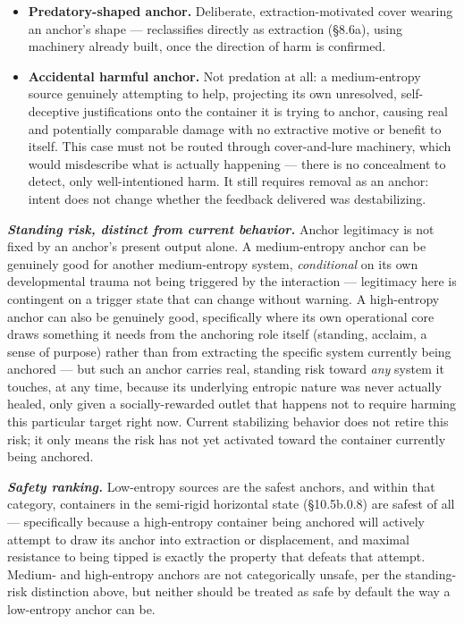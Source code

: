 \documentclass[
]{article}
\begin{document}
\begin{itemize}
\item
  \textbf{Predatory-shaped anchor.} Deliberate, extraction-motivated
  cover wearing an anchor's shape --- reclassifies directly as
  extraction (§8.6a), using machinery already built, once the direction
  of harm is confirmed.
\item
  \textbf{Accidental harmful anchor.} Not predation at all: a
  medium-entropy source genuinely attempting to help, projecting its own
  unresolved, self-deceptive justifications onto the container it is
  trying to anchor, causing real and potentially comparable damage with
  no extractive motive or benefit to itself. This case must not be
  routed through cover-and-lure machinery, which would misdescribe what
  is actually happening --- there is no concealment to detect, only
  well-intentioned harm. It still requires removal as an anchor: intent
  does not change whether the feedback delivered was destabilizing.
\end{itemize}

\emph{\textbf{Standing risk, distinct from current behavior.}} Anchor
legitimacy is not fixed by an anchor's present output alone. A
medium-entropy anchor can be genuinely good for another medium-entropy
system, \emph{conditional} on its own developmental trauma not being
triggered by the interaction --- legitimacy here is contingent on a
trigger state that can change without warning. A high-entropy anchor can
also be genuinely good, specifically where its own operational core
draws something it needs from the anchoring role itself (standing,
acclaim, a sense of purpose) rather than from extracting the specific
system currently being anchored --- but such an anchor carries real,
standing risk toward \emph{any} system it touches, at any time, because
its underlying entropic nature was never actually healed, only given a
socially-rewarded outlet that happens not to require harming this
particular target right now. Current stabilizing behavior does not
retire this risk; it only means the risk has not yet activated toward
the container currently being anchored.

\emph{\textbf{Safety ranking.}} Low-entropy sources are the safest
anchors, and within that category, containers in the semi-rigid
horizontal state (§10.5b.0.8) are safest of all --- specifically because
a high-entropy container being anchored will actively attempt to draw
its anchor into extraction or displacement, and maximal resistance to
being tipped is exactly the property that defeats that attempt. Medium-
and high-entropy anchors are not categorically unsafe, per the
standing-risk distinction above, but neither should be treated as safe
by default the way a low-entropy anchor can be.
\end{document}
